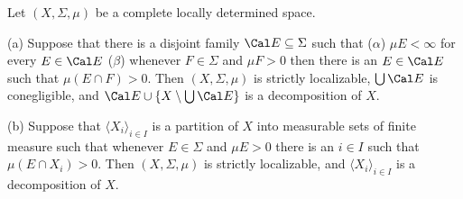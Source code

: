  Let $(X,\Sigma,\mu)$ be a complete locally
determined space.

(a) Suppose that there is a disjoint family $\Cal E\subseteq\Sigma$
such that ($\alpha$) $\mu E<\infty$ for every $E\in\Cal E$
($\beta$) whenever $F\in\Sigma$ and $\mu F>0$ then there is an
$E\in\Cal E$
such that $\mu(E\cap F)>0$.   Then $(X,\Sigma,\mu)$ is strictly
localizable, $\bigcup\Cal E$ is conegligible, and
$\Cal E\cup\{X\setminus\bigcup\Cal E\}$ is a
decomposition of $X$.

(b) Suppose that $\langle X_i\rangle_{i\in I}$ is a partition of $X$
into
measurable sets of finite measure such that whenever $E\in\Sigma$ and
$\mu E>0$ there is an $i\in I$ such that $\mu(E\cap X_i)>0$.   Then
$(X,\Sigma,\mu)$ is strictly localizable, and
$\langle X_i\rangle_{i\in I}$ is a decomposition of $X$.

